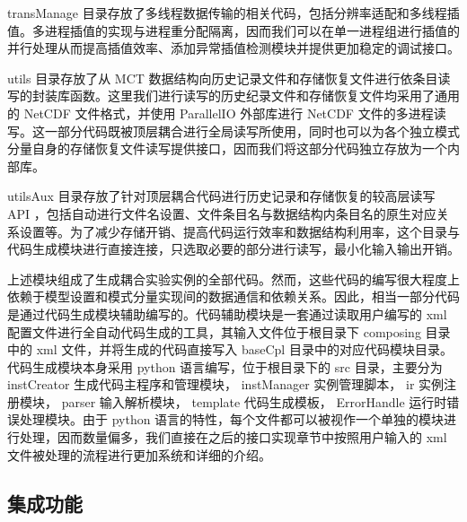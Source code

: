 transManage 目录存放了多线程数据传输的相关代码，包括分辨率适配和多线程插值。多进程插值的实现与进程重分配隔离，因而我们可以在单一进程组进行插值的并行处理从而提高插值效率、添加异常插值检测模块并提供更加稳定的调试接口。

utils 目录存放了从 MCT 数据结构向历史记录文件和存储恢复文件进行依条目读写的封装库函数。这里我们进行读写的历史纪录文件和存储恢复文件均采用了通用的 NetCDF 文件格式，并使用 ParallelIO 外部库进行 NetCDF 文件的多进程读写。这一部分代码既被顶层耦合进行全局读写所使用，同时也可以为各个独立模式分量自身的存储恢复文件读写提供接口，因而我们将这部分代码独立存放为一个内部库。

utilsAux 目录存放了针对顶层耦合代码进行历史记录和存储恢复的较高层读写 API ，包括自动进行文件名设置、文件条目名与数据结构内条目名的原生对应关系设置等。为了减少存储开销、提高代码运行效率和数据结构利用率，这个目录与代码生成模块进行直接连接，只选取必要的部分进行读写，最小化输入输出开销。

上述模块组成了生成耦合实验实例的全部代码。然而，这些代码的编写很大程度上依赖于模型设置和模式分量实现间的数据通信和依赖关系。因此，相当一部分代码是通过代码生成模块辅助编写的。代码辅助模块是一套通过读取用户编写的 xml 配置文件进行全自动代码生成的工具，其输入文件位于根目录下 composing 目录中的 xml 文件，并将生成的代码直接写入 baseCpl 目录中的对应代码模块目录。代码生成模块本身采用 python 语言编写，位于根目录下的 src 目录，主要分为 instCreator 生成代码主程序和管理模块， instManager 实例管理脚本， ir 实例注册模块， parser 输入解析模块， template 代码生成模板， ErrorHandle 运行时错误处理模块。由于 python 语言的特性，每个文件都可以被视作一个单独的模块进行处理，因而数量偏多，我们直接在之后的接口实现章节中按照用户输入的 xml 文件被处理的流程进行更加系统和详细的介绍。

\subsection{集成功能}

